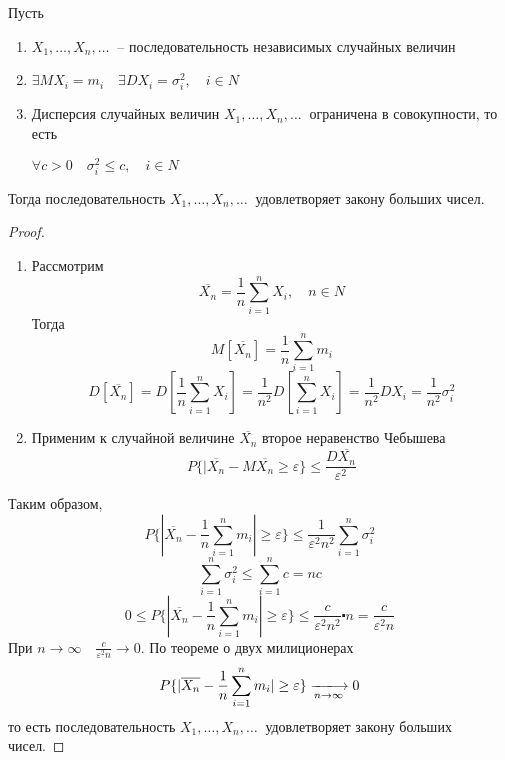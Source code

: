 \documentclass[a4paper, 12pt]{article}
\theoremstyle{definition}
\theoremstyle{leads}
\theoremstyle{example}
\newcommand{\infseq}[3]{%
	\ensuremath{#1_#2, \dots, #1_#3, \dots}\ }
\newcommand{\infseqX}{%
	\infseq{X}{1}{n}}
\begin{document}
\begin{bcheb}
	Пусть 
	\begin{enumerate}
		\item $\infseqX$ -- последовательность независимых случайных величин
		\item $\exists MX_i = m_i \quad \exists DX_i = \sigma_i^2, \quad i \in N$
		\item Дисперсия случайных величин $\infseqX$ ограничена в совокупности, то есть
		\begin{center}
			\centering
			$\forall c > 0 \quad \sigma_i^2 \leq c, \quad i \in N$
		\end{center}
	\end{enumerate}
Тогда последовательность $\infseqX$ удовлетворяет закону больших чисел.
\end{bcheb}
\begin{proof}
	\begin{enumerate}
		\item Рассмотрим 
		\begin{displaymath}
		\overline{X_n} = \frac{1}{n} \sum_{i = 1}^{n}X_i,\quad n \in N
		\end{displaymath}
		Тогда
		\begin{displaymath}
			M[\overline{X_n}] = \frac{1}{n} \sum_{i=1}^{n} m_i
		\end{displaymath}
		\begin{displaymath}
			D[\overline{X_n}] = D[\frac{1}{n} \sum_{i=1}^{n} X_i] = \frac{1}{n^2} D[\sum_{i = 1}^{n}X_i] = \frac{1}{n^2}DX_i = \frac{1}{n^2} \sigma_i^2
		\end{displaymath}
		\item Применим к случайной величине $\overline{X_n}$ второе неравенство Чебышева
		\begin{displaymath} 
			P\{|\overline{X_n} - M\overline{X_n} \geq \varepsilon\} \leq \frac{D\overline{X_n}}{\varepsilon^2}
		\end{displaymath}
	\end{enumerate}
Таким образом, 
\begin{displaymath}
P\{|\overline{X_n} - \frac{1}{n}\sum_{i=1}^{n} m_i|\geq \varepsilon\} \leq \frac{1}{\varepsilon^2 n^2}\sum_{i=1}^{n} \sigma_i^2
\end{displaymath}
\begin{displaymath}
	\sum_{i=1}^{n} \sigma_i^2 \leq \sum_{i=1}^{n} c = nc
\end{displaymath}
\begin{displaymath}
	0 \leq P\{|\overline{X_n} - \frac{1}{n} \sum_{i=1}^{n} m_i| \geq \varepsilon\} \leq \frac{c}{\varepsilon^2 n^2} \centerdot n = \frac{c}{\varepsilon^2 n}
\end{displaymath}
При $n\rightarrow \infty \quad \frac{c}{\varepsilon^2 n} \rightarrow 0$.
По теореме о двух милиционерах
\begin{displaymath}
	P\{|\overline{X_n} - \frac{1}{n}\sum_{i = 1}^{n}m_i| \geq \varepsilon\} \xlongrightarrow[n\rightarrow \infty]{} 0
\end{displaymath}
то есть последовательность $\infseqX$ удовлетворяет закону больших чисел.
\end{proof}
\end{document}
